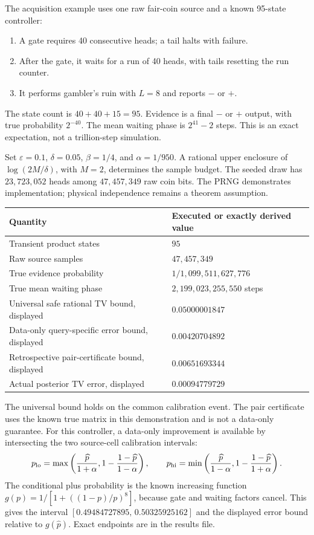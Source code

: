 \documentclass[11pt]{article}
\begin{document}
The acquisition example uses one raw fair-coin source and a known
95-state controller:
\begin{enumerate}
\item A gate requires 40 consecutive heads; a tail halts with failure.
\item After the gate, it waits for a run of 40 heads, with tails resetting
      the run counter.
\item It performs gambler's ruin with $L=8$ and reports $-$ or $+$.
\end{enumerate}
The state count is $40+40+15=95$. Evidence is a final $-$ or $+$ output,
with true probability $2^{-40}$. The mean waiting phase is $2^{41}-2$
steps. This is an exact expectation, not a trillion-step simulation.

Set $\varepsilon=0.1$, $\delta=0.05$, $\beta=1/4$, and $\alpha=1/950$.
A rational upper enclosure of $\log(2M/\delta)$, with $M=2$, determines
the sample budget. The seeded draw has $23{,}723{,}052$ heads among
$47{,}457{,}349$ raw coin bits. The PRNG demonstrates implementation;
physical independence remains a theorem assumption.

\begin{center}
\begin{tabular}{ll}
\toprule
Quantity & Executed or exactly derived value\\
\midrule
Transient product states & $95$\\
Raw source samples & $47{,}457{,}349$\\
True evidence probability & $1/1{,}099{,}511{,}627{,}776$\\
True mean waiting phase & $2{,}199{,}023{,}255{,}550$ steps\\
Universal safe rational TV bound, displayed & $0.05000001847$\\
Data-only query-specific error bound, displayed & $0.00420704892$\\
Retrospective pair-certificate bound, displayed & $0.00651693344$\\
Actual posterior TV error, displayed & $0.00094779729$\\
\bottomrule
\end{tabular}
\end{center}

The universal bound holds on the common calibration event. The pair
certificate uses the known true matrix in this demonstration and is
not a data-only guarantee. For this controller, a data-only improvement
is available by intersecting the two source-cell calibration intervals:
\[
 p_{\rm lo}=\max\left(\frac{\widehat p}{1+\alpha},
                    1-\frac{1-\widehat p}{1-\alpha}\right),\qquad
 p_{\rm hi}=\min\left(\frac{\widehat p}{1-\alpha},
                    1-\frac{1-\widehat p}{1+\alpha}\right).
\]
The conditional plus probability is the known increasing function
$g(p)=1/[1+((1-p)/p)^8]$, because gate and waiting factors cancel.
This gives the interval
$[0.49484727895,\,0.50325925162]$ and the displayed error bound
relative to $g(\widehat p)$. Exact endpoints are in the results file.
\end{document}

